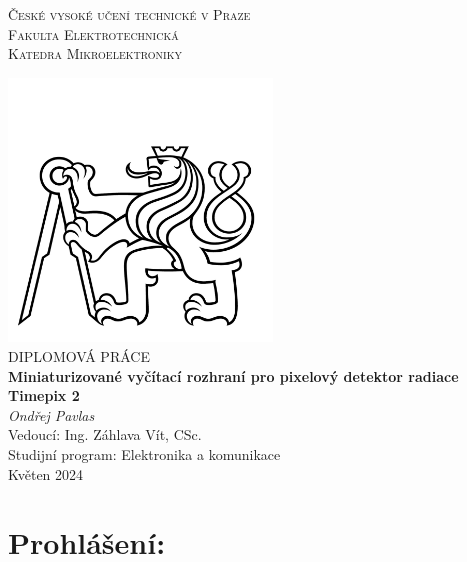 \documentclass[twoside, 11pt, openany]{report}
\newcommand\blankpage{%
	\null
	\thispagestyle{empty}%
	\cleardoublepage}
\begin{document}
	\begin{titlepage}
		\begin{large}
			\begin{flushleft}
				\textsc{České vysoké učení technické v Praze}\\
				\textsc{Fakulta Elektrotechnická}\\
				\textsc{Katedra Mikroelektroniky}\\
			\end{flushleft}
		\end{large}
		\begin{center}
			\vspace{1.5 cm}
			\includegraphics[width=7cm]{symbol.jpg}\\[1.0 cm]
			{DIPLOMOVÁ PRÁCE}\\[0.5 cm]
			\vspace{1.5 cm}
			{\textbf{\Large Miniaturizované vyčítací rozhraní pro pixelový detektor radiace Timepix 2}} \\[1.5cm]
			{\textit {Ondřej Pavlas}}\\[1.0 cm]
			{Vedoucí: Ing. Záhlava Vít, CSc.}\\[1.0 cm]
			Studijní program: Elektronika a komunikace\\
			{Květen 2024}
		\end{center}
	\end{titlepage}
	
\thispagestyle{empty}
\afterpage{\blankpage}
\clearpage

	
\setcounter{page}{3}



\chapter*{Prohlášení:}

\end{document}
